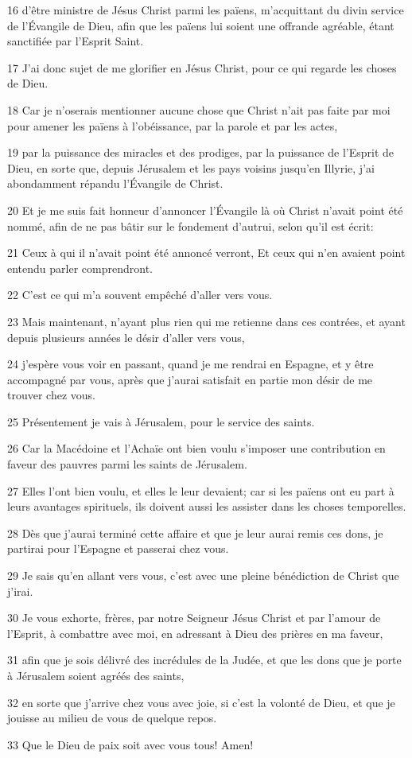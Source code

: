 \par 16 d'être ministre de Jésus Christ parmi les païens, m'acquittant du divin service de l'Évangile de Dieu, afin que les païens lui soient une offrande agréable, étant sanctifiée par l'Esprit Saint.
\par 17 J'ai donc sujet de me glorifier en Jésus Christ, pour ce qui regarde les choses de Dieu.
\par 18 Car je n'oserais mentionner aucune chose que Christ n'ait pas faite par moi pour amener les païens à l'obéissance, par la parole et par les actes,
\par 19 par la puissance des miracles et des prodiges, par la puissance de l'Esprit de Dieu, en sorte que, depuis Jérusalem et les pays voisins jusqu'en Illyrie, j'ai abondamment répandu l'Évangile de Christ.
\par 20 Et je me suis fait honneur d'annoncer l'Évangile là où Christ n'avait point été nommé, afin de ne pas bâtir sur le fondement d'autrui, selon qu'il est écrit:
\par 21 Ceux à qui il n'avait point été annoncé verront, Et ceux qui n'en avaient point entendu parler comprendront.
\par 22 C'est ce qui m'a souvent empêché d'aller vers vous.
\par 23 Mais maintenant, n'ayant plus rien qui me retienne dans ces contrées, et ayant depuis plusieurs années le désir d'aller vers vous,
\par 24 j'espère vous voir en passant, quand je me rendrai en Espagne, et y être accompagné par vous, après que j'aurai satisfait en partie mon désir de me trouver chez vous.
\par 25 Présentement je vais à Jérusalem, pour le service des saints.
\par 26 Car la Macédoine et l'Achaïe ont bien voulu s'imposer une contribution en faveur des pauvres parmi les saints de Jérusalem.
\par 27 Elles l'ont bien voulu, et elles le leur devaient; car si les païens ont eu part à leurs avantages spirituels, ils doivent aussi les assister dans les choses temporelles.
\par 28 Dès que j'aurai terminé cette affaire et que je leur aurai remis ces dons, je partirai pour l'Espagne et passerai chez vous.
\par 29 Je sais qu'en allant vers vous, c'est avec une pleine bénédiction de Christ que j'irai.
\par 30 Je vous exhorte, frères, par notre Seigneur Jésus Christ et par l'amour de l'Esprit, à combattre avec moi, en adressant à Dieu des prières en ma faveur,
\par 31 afin que je sois délivré des incrédules de la Judée, et que les dons que je porte à Jérusalem soient agréés des saints,
\par 32 en sorte que j'arrive chez vous avec joie, si c'est la volonté de Dieu, et que je jouisse au milieu de vous de quelque repos.
\par 33 Que le Dieu de paix soit avec vous tous! Amen!

